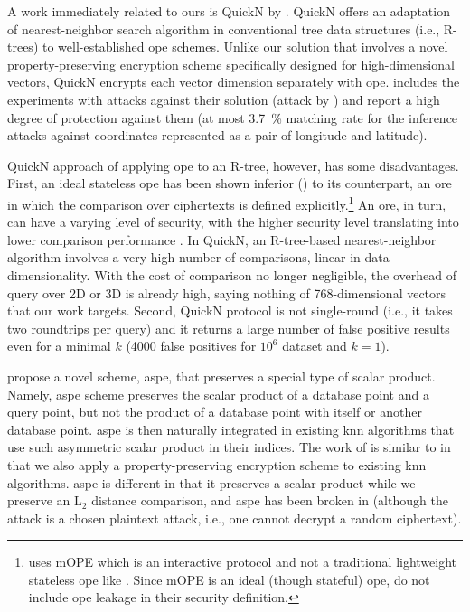 		A work immediately related to ours is QuickN by \textcite{quick-n}.
		QuickN offers an adaptation of nearest-neighbor search algorithm in conventional tree data structures (i.e., R-trees) to well-established \acrfull{ope} schemes.
		Unlike our solution that involves a novel property-preserving encryption scheme specifically designed for high-dimensional vectors, QuickN encrypts each vector dimension separately with \acrshort{ope}.
		\cite{quick-n} includes the experiments with attacks against their solution (attack by \textcite{leakage-abuse-grubs-2017}) and report a high degree of protection against them (at most \SI{3.7}{\percent} matching rate for the inference attacks against coordinates represented as a pair of longitude and latitude).

		QuickN approach of applying \acrshort{ope} to an R-tree, however, has some disadvantages.
		First, an ideal stateless \acrshort{ope} has been shown inferior (\cite{ope-leakage}) to its counterpart, an \acrfull{ore} in which the comparison over ciphertexts is defined explicitly.\footnote{
			\cite{quick-n} uses mOPE \cite{ope-ideal-security-protocol} which is an interactive protocol and not a traditional lightweight stateless \acrshort{ope} like \cite{bclo-ope}.
			Since mOPE is an ideal (though stateful) \acrshort{ope}, \textcite{quick-n} do not include \acrshort{ope} leakage in their security definition.
		}
		An \acrshort{ore}, in turn, can have a varying level of security, with the higher security level translating into lower comparison performance \cite{ore-benchmark-17}.
		In QuickN, an R-tree-based nearest-neighbor algorithm involves a very high number of comparisons, linear in data dimensionality.
		With the cost of comparison no longer negligible, the overhead of query over 2D or 3D is already high, saying nothing of 768-dimensional vectors that our work targets.
		Second, QuickN protocol is not single-round (i.e., it takes two roundtrips per query) and it returns a large number of false positive results even for a minimal $k$ (\num{4000} false positives for $10^6$ dataset and $k = 1$).

		\textcite{knn-aspe} propose a novel scheme, \acrshort{aspe}, that preserves a special type of scalar product.
		Namely, \acrfull{aspe} scheme preserves the scalar product of a database point and a query point, but not the product of a database point with itself or another database point.
		\acrshort{aspe} is then naturally integrated in existing \acrshort{knn} algorithms that use such asymmetric scalar product in their indices.
		The work of \textcite{knn-aspe} is similar to \kanon{} in that we also apply a property-preserving encryption scheme to existing \acrshort{knn} algorithms.
		\acrshort{aspe} is different in that it preserves a scalar product while we preserve an $\text{L}_2$ distance comparison, and \acrshort{aspe} has been broken in \cite{secure-nn-revisited-break-aspe} (although the attack is a chosen plaintext attack, i.e., one cannot decrypt a random ciphertext).

